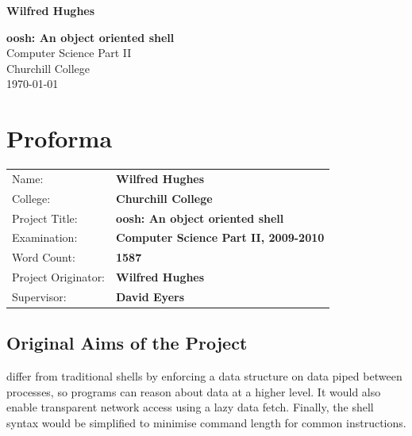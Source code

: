 \documentclass[12pt,twoside,notitlepage]{report}
\begin{document}





\pagestyle{empty}

\hfill{\LARGE \bf Wilfred Hughes}

\vspace*{60mm}
\begin{center}
\Huge
{\bf oosh: An object oriented shell} \\
\vspace*{5mm}
Computer Science Part II \\
\vspace*{5mm}
Churchill College \\
\vspace*{5mm}
\today  %
\end{center}

\cleardoublepage


\setcounter{page}{1}
\pagestyle{plain}

\chapter*{Proforma}

{\large
\begin{tabular}{ll}
Name:               & \bf Wilfred Hughes                       \\
College:            & \bf Churchill College                     \\
Project Title:      & \bf oosh: An object oriented shell \\
Examination:        & \bf Computer Science Part II, 2009-2010        \\
Word Count:         & \bf 1587 \\
Project Originator: & \bf Wilfred Hughes                    \\
Supervisor:         & \bf David Eyers                    \\ 
\end{tabular}
}

\section*{Original Aims of the Project}
differ from traditional shells by enforcing a data structure on data piped
between processes, so programs can reason about data at a higher level. It would
also enable transparent network access using a lazy data fetch. Finally, the
shell syntax would be simplified to minimise command length for common
instructions.
\end{document}
